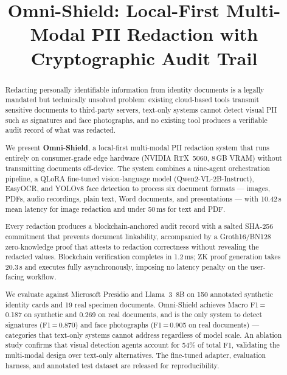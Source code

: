 \documentclass[conference]{IEEEtran}
\title{Omni-Shield: Local-First Multi-Modal PII
Redaction with Cryptographic Audit Trail}
\author{
  \IEEEauthorblockN{Anonymous Author(s)}
  \IEEEauthorblockA{
    Affiliation Withheld for Review
  }
}
\begin{document}
\maketitle

\begin{abstract}

Redacting personally identifiable information from
identity documents is a legally mandated but technically
unsolved problem: existing cloud-based tools transmit
sensitive documents to third-party servers, text-only
systems cannot detect visual PII such as signatures
and face photographs, and no existing tool produces a
verifiable audit record of what was redacted.

We present \textbf{Omni-Shield}, a local-first
multi-modal PII redaction system that runs entirely
on consumer-grade edge hardware (NVIDIA RTX~5060,
8\,GB VRAM) without transmitting documents off-device.
The system combines a nine-agent orchestration
pipeline, a QLoRA fine-tuned vision-language model
(Qwen2-VL-2B-Instruct), EasyOCR, and YOLOv8 face
detection to process six document formats --- images,
PDFs, audio recordings, plain text, Word documents,
and presentations --- with 10.42\,s mean latency for
image redaction and under 50\,ms for text and PDF.

Every redaction produces a blockchain-anchored audit
record with a salted SHA-256 commitment that prevents
document linkability, accompanied by a Groth16/BN128
zero-knowledge proof that attests to redaction
correctness without revealing the redacted values.
Blockchain verification completes in 1.2\,ms;
ZK proof generation takes 20.3\,s and executes
fully asynchronously, imposing no latency penalty
on the user-facing workflow.

We evaluate against Microsoft Presidio and Llama~3~8B
on 150 annotated synthetic identity cards and 19 real
specimen documents.
Omni-Shield achieves Macro F1\,=\,0.187 on synthetic
and 0.269 on real documents, and is the only system
to detect signatures (F1\,=\,0.870) and face
photographs (F1\,=\,0.905 on real documents) ---
categories that text-only systems cannot address
regardless of model scale.
An ablation study confirms that visual detection
agents account for 54\% of total F1, validating
the multi-modal design over text-only alternatives.
The fine-tuned adapter, evaluation harness, and
annotated test dataset are released for reproducibility.

\end{abstract}
\end{document}
